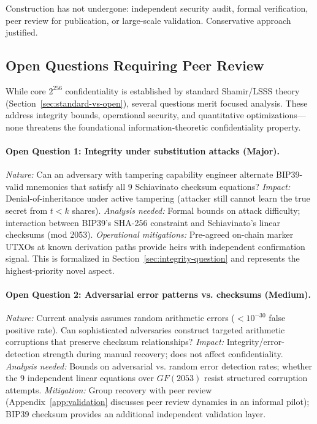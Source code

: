 \documentclass[11pt]{article}
\begin{document}
Construction has not undergone: independent security audit, formal verification, peer review for publication, or large-scale validation. Conservative approach justified.

\subsection{Open Questions Requiring Peer Review}

While core $2^{256}$ confidentiality is established by standard Shamir/LSSS theory (Section~\ref{sec:standard-vs-open}), several questions merit focused analysis. These address integrity bounds, operational security, and quantitative optimizations—none threatens the foundational information-theoretic confidentiality property.

\paragraph{Open Question 1: Integrity under substitution attacks (Major).} \textit{Nature:} Can an adversary with tampering capability engineer alternate BIP39-valid mnemonics that satisfy all 9 Schiavinato checksum equations? \textit{Impact:} Denial-of-inheritance under active tampering (attacker still cannot learn the true secret from $t < k$ shares). \textit{Analysis needed:} Formal bounds on attack difficulty; interaction between BIP39's SHA-256 constraint and Schiavinato's linear checksums (mod 2053). \textit{Operational mitigations:} Pre-agreed on-chain marker UTXOs at known derivation paths provide heirs with independent confirmation signal. This is formalized in Section~\ref{sec:integrity-question} and represents the highest-priority novel aspect.

\paragraph{Open Question 2: Adversarial error patterns vs. checksums (Medium).} \textit{Nature:} Current analysis assumes random arithmetic errors ($< 10^{-30}$ false positive rate). Can sophisticated adversaries construct targeted arithmetic corruptions that preserve checksum relationships? \textit{Impact:} Integrity/error-detection strength during manual recovery; does not affect confidentiality. \textit{Analysis needed:} Bounds on adversarial vs. random error detection rates; whether the 9 independent linear equations over $GF(2053)$ resist structured corruption attempts. \textit{Mitigation:} Group recovery with peer review (Appendix~\ref{app:validation} discusses peer review dynamics in an informal pilot); BIP39 checksum provides an additional independent validation layer.
\end{document}
